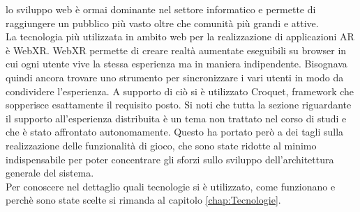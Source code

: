 lo sviluppo web è ormai dominante nel settore informatico e permette di raggiungere un pubblico più vasto oltre che comunità più grandi e attive.\\
La tecnologia più utilizzata in ambito web per la realizzazione di applicazioni AR è WebXR. WebXR permette di creare realtà aumentate eseguibili su browser in cui ogni utente
vive la stessa esperienza ma in maniera indipendente. Bisognava quindi ancora trovare uno strumento per sincronizzare i vari utenti in modo da condividere l'esperienza. A supporto 
di ciò si è utilizzato Croquet, framework che sopperisce esattamente il requisito posto. Si noti che tutta la sezione riguardante il supporto all'esperienza distribuita è un tema
non trattato nel corso di studi e che è stato affrontato autonomamente. Questo ha portato però a dei tagli sulla realizzazione delle funzionalità di gioco, che sono state ridotte
al minimo indispensabile per poter concentrare gli sforzi sullo sviluppo dell'architettura generale del sistema.\\
\newline
Per conoscere nel dettaglio quali tecnologie si è utilizzato, come funzionano e perchè sono state scelte si rimanda al capitolo \ref{chap:Tecnologie}.